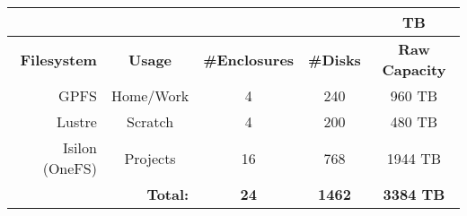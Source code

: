 % 
% 
% 


\begin{table}[h]
  \vspace{-2ex}
  \centering\scriptsize
  \begin{tabular}{|r||c|c|c|c|}
    \multicolumn{4}{c}{}  & \multicolumn{1}{c}{TB}\\\hline
    \rowcolor{lightgray}
    \textbf{Filesystem}     & \textbf{Usage}  & \textbf{\#Enclosures} & \textbf{\#Disks} & \textbf{Raw Capacity} \\ \hline \hline
    GPFS               & Home/Work       & 4                     & 240              & 960 TB                  \\
    Lustre             & Scratch         & 4                     & 200              & 480 TB                  \\
    Isilon (OneFS)     & Projects        & 16                    & 768              & 1944 TB                 \\ \hline
    \multicolumn{2}{r}{\textbf{Total:}} & \multicolumn{1}{c}{\textbf{24}} & \multicolumn{1}{c}{\textbf{1462}} & \multicolumn{1}{c}{\textbf{3384 TB}}       \\ 
  \end{tabular}
\end{table}



% 

